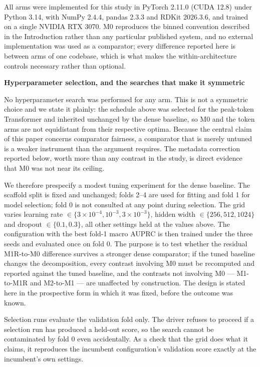 \documentclass[11pt]{article}
\newcommand{\hd}[1]{\medskip\par\noindent\textbf{#1}\par\nobreak\vspace{2pt}\noindent\ignorespaces}
\begin{document}
All arms were implemented for this study in PyTorch 2.11.0 (CUDA 12.8) under Python 3.14, with NumPy 2.4.4, pandas 2.3.3 and RDKit 2026.3.6, and trained on a single NVIDIA RTX 3070. M0 reproduces the binned convention described in the Introduction rather than any particular published system, and no external implementation was used as a comparator; every difference reported here is between arms of one codebase, which is what makes the within-architecture controls necessary rather than optional.

\hd{Hyperparameter selection, and the searches that make it symmetric}
No hyperparameter search was performed for any arm. This is not a symmetric choice and we state it plainly: the schedule above was selected for the peak-token Transformer and inherited unchanged by the dense baseline, so M0 and the token arms are not equidistant from their respective optima. Because the central claim of this paper concerns comparator fairness, a comparator that is merely untuned is a weaker instrument than the argument requires. The metadata correction reported below, worth more than any contrast in the study, is direct evidence that M0 was not near its ceiling.

We therefore prespecify a modest tuning experiment for the dense baseline. The scaffold split is fixed and unchanged; folds 2--4 are used for fitting and fold 1 for model selection; fold 0 is not consulted at any point during selection. The grid varies learning rate $\in\{3\times10^{-4}, 10^{-3}, 3\times10^{-3}\}$, hidden width $\in\{256, 512, 1024\}$ and dropout $\in\{0.1, 0.3\}$, all other settings held at the values above. The configuration with the best fold-1 macro AUPRC is then trained under the three seeds and evaluated once on fold 0. The purpose is to test whether the residual M1R-to-M0 difference survives a stronger dense comparator; if the tuned baseline changes the decomposition, every contrast involving M0 must be recomputed and reported against the tuned baseline, and the contrasts not involving M0 --- M1-to-M1R and M2-to-M1 --- are unaffected by construction. The design is stated here in the prospective form in which it was fixed, before the outcome was known.

Selection runs evaluate the validation fold only. The driver refuses to proceed if a
selection run has produced a held-out score, so the search cannot be contaminated by
fold 0 even accidentally. As a check that the grid does what it claims, it
reproduces the incumbent configuration's validation score exactly at the
incumbent's own settings.
\end{document}
